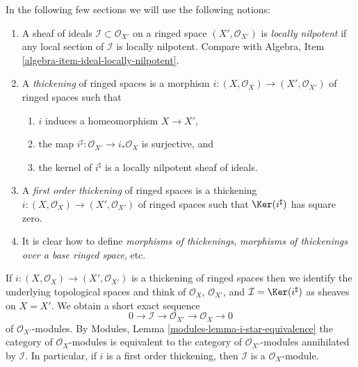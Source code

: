\noindent
In the following few sections we will use the following notions:
\begin{enumerate}
\item A sheaf of ideals $\mathcal{I} \subset \mathcal{O}_{X'}$ on
a ringed space $(X', \mathcal{O}_{X'})$ is {\it locally nilpotent}
if any local section of $\mathcal{I}$ is locally nilpotent.
Compare with Algebra, Item \ref{algebra-item-ideal-locally-nilpotent}.
\item A {\it thickening} of ringed spaces is a morphism
$i : (X, \mathcal{O}_X) \to (X', \mathcal{O}_{X'})$ of ringed spaces
such that
\begin{enumerate}
\item $i$ induces a homeomorphism $X \to X'$,
\item the map $i^\sharp : \mathcal{O}_{X'} \to i_*\mathcal{O}_X$
is surjective, and
\item the kernel of $i^\sharp$ is a locally nilpotent sheaf of ideals.
\end{enumerate}
\item A {\it first order thickening} of ringed spaces is a thickening
$i : (X, \mathcal{O}_X) \to (X', \mathcal{O}_{X'})$ of ringed spaces
such that $\Ker(i^\sharp)$ has square zero.
\item It is clear how to define {\it morphisms of thickenings},
{\it morphisms of thickenings over a base ringed space}, etc.
\end{enumerate}
If $i : (X, \mathcal{O}_X) \to (X', \mathcal{O}_{X'})$ is a thickening
of ringed spaces then we identify the underlying topological spaces
and think of $\mathcal{O}_X$, $\mathcal{O}_{X'}$, and
$\mathcal{I} = \Ker(i^\sharp)$ as sheaves on $X = X'$. We obtain
a short exact sequence
$$
0 \to \mathcal{I} \to \mathcal{O}_{X'} \to \mathcal{O}_X \to 0
$$
of $\mathcal{O}_{X'}$-modules. By
Modules, Lemma \ref{modules-lemma-i-star-equivalence}
the category of $\mathcal{O}_X$-modules is equivalent to the category
of $\mathcal{O}_{X'}$-modules annihilated by $\mathcal{I}$. In particular,
if $i$ is a first order thickening, then
$\mathcal{I}$ is a $\mathcal{O}_X$-module.

